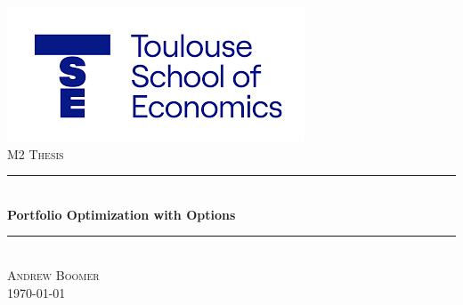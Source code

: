 

\usepackage[justification=centering, skip=0pt]{caption}

\begin{titlepage}

\newcommand{\HRule}{\rule{\linewidth}{0.25mm}} %
\setlength{\topmargin}{-0.5in}
\setlength{\textfloatsep}{0pt}
\center %

\includegraphics[scale=0.75]{TSE.png}\\

\large \textsc{M2 Thesis} 
\vspace{1.5cm}
\textsc{\large } %


\HRule \\[0.75cm]
{ \huge \bfseries Portfolio Optimization with Options}\\[0.5cm] %
\HRule \\[1.75cm]
 

\large\textsc{Andrew Boomer} \\[1.5cm]


{\large \today}\\[0.5cm] %

\vfill %

\end{titlepage}

